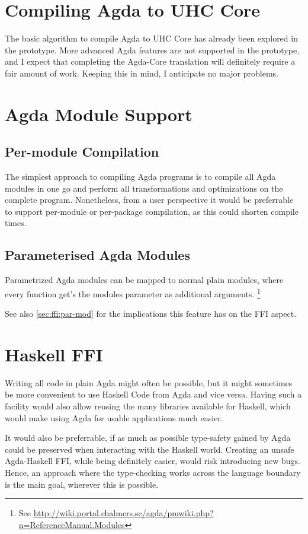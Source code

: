 \documentclass[12pt, a4paper, twoside]{report}
\begin{document}
\section{Compiling Agda to UHC Core}
The basic algorithm to compile Agda to UHC Core has already been explored in the prototype. More
advanced Agda features are not supported in the prototype, and I expect that completing the
Agda-Core translation will definitely require a fair amount of work. Keeping this in mind,
I anticipate no major problems.

\section{Agda Module Support}
\subsection{Per-module Compilation}
The simplest approach to compiling Agda programs is to compile all Agda modules in one go
and perform all transformations and optimizations on the complete program. Nonetheless, from
a user perspective it would be preferrable to support per-module or per-package compilation,
as this could shorten compile times.

\subsection{Parameterised Agda Modules}
Parametrized Agda modules can be mapped to normal plain modules, where every function get's the
modules parameter as additional arguments.
\footnote{See \url{http://wiki.portal.chalmers.se/agda/pmwiki.php?n=ReferenceManual.Modules}}

See also \ref{sec:ffi:par-mod} for the implications this feature has on the FFI aspect.

\section{Haskell FFI}
\label{sec:prop:hs-ffi}
Writing all code in plain Agda might often be possible, but it might sometimes be more
convenient to use Haskell Code from Agda and vice versa. Having such a facility would
also allow reusing the many libraries available for Haskell, which would make using Agda
for usable applications much easier.

It would also be preferrable, if as much as possible type-safety gained by Agda could be
preserved when interacting with the Haskell world. Creating an unsafe Agda-Haskell
FFI, while being definitely easier, would risk introducing new bugs. Hence, an approach
where the type-checking works across the language boundary is the main goal, wherever
this is possible.
\end{document}
